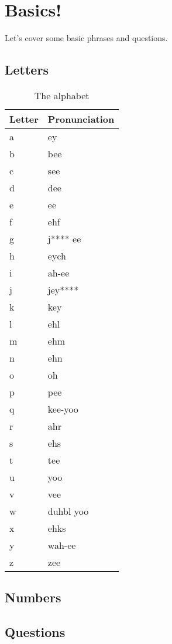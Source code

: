 \chapter{Basics!}

Let's cover some basic phrases and questions.

\section{Letters}

\begin{table}[H]
	\centering
	\begin{tabular}{ll}
	\toprule
	\textbf{Letter} & \textbf{Pronunciation} \\
	\midrule
	a & ey \\
	b & bee \\
	c & see \\
	d & dee \\
	e & ee \\
	f & ehf \\
	g & j**** ee \\
	h & eych \\
	i & ah-ee \\
	j & jey**** \\
	k & key \\
	l & ehl \\
	m & ehm \\
	n & ehn \\
	o & oh \\
	p & pee \\
	q & kee-yoo \\
	r & ahr \\
	s & ehs \\
	t & tee \\
	u & yoo \\
	v & vee \\
	w & duhbl yoo \\
	x & ehks \\
	y & wah-ee \\
	z & zee \\
	\bottomrule
	\end{tabular}
	\caption{The alphabet}
\end{table}

\section{Numbers}

\section{Questions}


